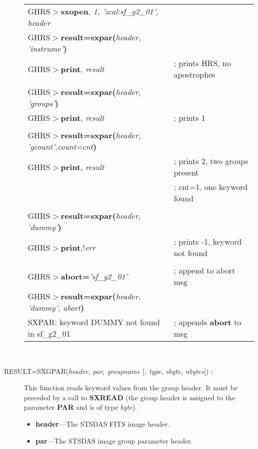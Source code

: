 \begin{description}
\begin{small}
\begin{tabular}{ll}
GHRS$>${\bf sxopen}, {\it 1, 'zcal:sf\_g2\_01', header} & \\
GHRS$>${\bf result=sxpar(}{\it header, 'instrume'}{\bf )} & \\
GHRS$>${\bf print}, {\it result} & ; prints HRS, no apostrophes\\
 & \\
GHRS$>${\bf result=sxpar(}{\it header, 'groups'}{\bf )} & \\
GHRS$>${\bf print}, {\it result} & ; prints 1\\
& \\
GHRS$>${\bf result=sxpar(}{\it header, 'gcount',count=cnt}{\bf )} & \\
GHRS$>${\bf print}, {\it result} & ; prints 2, two groups present\\
& ; cnt=1, one keyword found\\
& \\
GHRS$>${\bf result=sxpar(}{\it header, 'dummy'}{\bf )} & \\
GHRS$>${\bf print},{\it $!$err} & ; prints -1, keyword not found\\
& \\
GHRS$>${\bf abort=}{\it 'sf\_g2\_01'} & ; append to abort msg\\
GHRS$>${\bf result=sxpar(}{\it header, 'dummy', abort}{\bf )} & \\
SXPAR: keyword DUMMY not found in sf\_g2\_01 & ; appends {\bf abort} to msg\\
\end{tabular}\\
\end{small}

\item [RESULT=SXGPAR({\it header, par, groupname $[$, type, sbyte, nbytes$]$}) : ] 

This function reads keyword values from the group header.  It must be preceded 
by a call to {\bf SXREAD} (the group header is assigned to the parameter 
{\bf PAR} and is of type {\it byte}).

\begin{itemize}

\item {\bf header}---The STSDAS FITS image header.

\item {\bf par}---The STSDAS image group parameter header.


\end{itemize}
\end{description}
